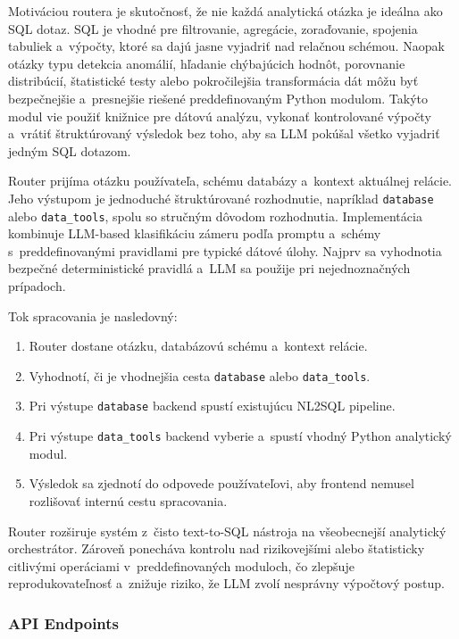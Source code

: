 \documentclass[a4paper, 12pt]{article}
\begin{document}
Motiváciou routera je skutočnosť, že nie každá analytická otázka je ideálna ako SQL dotaz. SQL je vhodné pre filtrovanie, agregácie, zoraďovanie, spojenia tabuliek a~výpočty, ktoré sa dajú jasne vyjadriť nad relačnou schémou. Naopak otázky typu detekcia anomálií, hľadanie chýbajúcich hodnôt, porovnanie distribúcií, štatistické testy alebo pokročilejšia transformácia dát môžu byť bezpečnejšie a~presnejšie riešené preddefinovaným Python modulom. Takýto modul vie použiť knižnice pre dátovú analýzu, vykonať kontrolované výpočty a~vrátiť štruktúrovaný výsledok bez toho, aby sa LLM pokúšal všetko vyjadriť jedným SQL dotazom.

Router prijíma otázku používateľa, schému databázy a~kontext aktuálnej relácie. Jeho výstupom je jednoduché štruktúrované rozhodnutie, napríklad \texttt{database} alebo \texttt{data\_tools}, spolu so stručným dôvodom rozhodnutia. Implementácia kombinuje LLM-based klasifikáciu zámeru podľa promptu a~schémy s~preddefinovanými pravidlami pre typické dátové úlohy. Najprv sa vyhodnotia bezpečné deterministické pravidlá a~LLM sa použije pri nejednoznačných prípadoch.

Tok spracovania je nasledovný:

\begin{enumerate}
    \item Router dostane otázku, databázovú schému a~kontext relácie.
    \item Vyhodnotí, či je vhodnejšia cesta \texttt{database} alebo \texttt{data\_tools}.
    \item Pri výstupe \texttt{database} backend spustí existujúcu NL2SQL pipeline.
    \item Pri výstupe \texttt{data\_tools} backend vyberie a~spustí vhodný Python analytický modul.
    \item Výsledok sa zjednotí do odpovede používateľovi, aby frontend nemusel rozlišovať internú cestu spracovania.
\end{enumerate}

Router rozširuje systém z~čisto text-to-SQL nástroja na všeobecnejší analytický orchestrátor. Zároveň ponecháva kontrolu nad rizikovejšími alebo štatisticky citlivými operáciami v~preddefinovaných moduloch, čo zlepšuje reprodukovateľnosť a~znižuje riziko, že LLM zvolí nesprávny výpočtový postup.

\subsubsection{API Endpoints}
\end{document}
